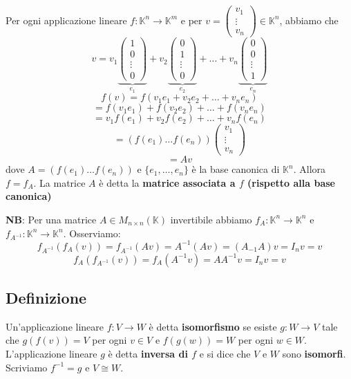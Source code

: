 \documentclass[a4paper]{article}
\theoremstyle{break}
\theoremstyle{break}
\theoremstyle{break}
\theoremstyle{break}
\begin{document}
Per ogni applicazione lineare \( f: \mathbb{K}^n \to \mathbb{K}^m \) e per 
\( v = \begin{pmatrix} v_1\\\vdots\\v_n \end{pmatrix} \in \mathbb{K}^n \), abbiamo che
\[
  v = v_1 \underbrace{\begin{pmatrix} 
  1\\0\\\vdots\\0
\end{pmatrix}}_{e_1}
+ v_2 \underbrace{\begin{pmatrix} 
  0\\1\\\vdots\\0
\end{pmatrix}}_{e_2}
+ \ldots +
v_n \underbrace{\begin{pmatrix} 
  0\\0\\\vdots\\1
\end{pmatrix}}_{e_n}
\] 
\[
f(v) = f(v_1 e_1 + v_2 e_2 + \ldots + v_n e_n)
\] 
\[
= f(v_1 e_1) + f(v_2 e_2) + \ldots + f(v_n e_n)
\] 
\[
= v_1 f(e_1) + v_2 f(e_2) + \ldots + v_n f(e_n)
\] 
\[
= \left( f(e_1) \ldots f(e_n) \right) \begin{pmatrix} v_1\\\vdots\\v_n \end{pmatrix} 
\] 
\[
= Av
\] 
dove \( A = (f(e_1) \ldots f(e_n)) \) e \( \{e_1, \ldots, e_n\}  \) è la base canonica
di \( \mathbb{K}^n \). Allora \( f = f_A \). La matrice \( A \) è detta la
\textbf{matrice associata a \( f \) (rispetto alla base canonica)}

\vspace{1em}
\noindent \textbf{NB}: Per una matrice \( A \in M_{n \times n}(\mathbb{K}) \) invertibile
abbiamo \( f_A: \mathbb{K}^n \to \mathbb{K}^n \) e \( f_{A^{-1}}: \mathbb{K}^n \to \mathbb{K}^n \).
Osserviamo:
\[
  f_{A^{-1}}(f_A(v)) = f_{A^{-1}}(Av) = A^{-1}(Av) = (A_{-1}A)v = I_nv = v
\] 
\[
  f_A(f_{A^{-1}}(v)) = f_A(A^{-1}v) = AA^{-1}v = I_nv = v
\] 

\subsection{Definizione}
\label{def:7.3}
Un'applicazione lineare \( f: V \to W \) è detta \textbf{isomorfismo} se esiste
\( g: W \to V \) tale che \( g(f(v)) = V \) per ogni \( v \in V \) e
\( f(g(w)) = W \) per ogni \( w \in W \). L'applicazione lineare \( g \) è detta
\textbf{inversa di \( f \) } e si dice che \( V \) e \( W \) sono \textbf{isomorfi}.
Scriviamo \( f^{-1} = g \) e \( V \cong W \).
\end{document}
